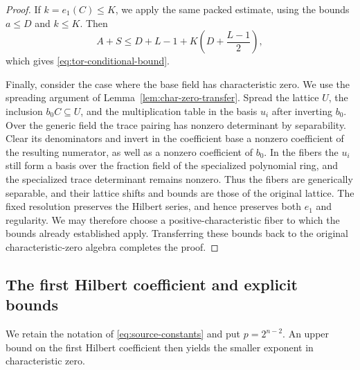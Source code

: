 \documentclass[12pt]{amsart}
\numberwithin{equation}{section}
\theoremstyle{definition}
\theoremstyle{remark}
\numberwithin{equation}{section}
\begin{document}
\begin{proof}
	If $k=e_1(C)\le K$, we apply the same packed estimate, using the
	bounds $a\le D$ and $k\le K$. Then
	\[
	A+S\le D+L-1+K\left(D+\frac{L-1}{2}\right),
	\]
	which gives \eqref{eq:tor-conditional-bound}.

Finally, consider the case where the base field has characteristic zero. We use the spreading argument of
Lemma~\ref{lem:char-zero-transfer}.  Spread the lattice $U$, the inclusion $b_0C\subseteq U$, and the multiplication table in the basis $u_i$ after inverting $b_0$. Over the generic field the trace pairing has nonzero determinant by separability. Clear its denominators and invert in the coefficient base a nonzero coefficient of the resulting numerator, as well as a nonzero coefficient of $b_0$. In the fibers the $u_i$ still form a basis over the fraction field of the specialized polynomial ring, and the specialized trace determinant remains nonzero. Thus the fibers are generically separable, and their lattice shifts and bounds are those of the original lattice. The fixed resolution preserves the Hilbert series, and hence preserves both $e_1$ and regularity.
We may therefore choose a positive-characteristic fiber to which the bounds already established apply. Transferring
these bounds back to the original characteristic-zero algebra completes the proof.
\end{proof}

\subsection{The first Hilbert coefficient and explicit bounds}
\label{subsec:hilbert-explicit}

We retain the notation of \eqref{eq:source-constants} and put $p=2^{n-2}$.  An upper  bound  on the first Hilbert coefficient  then yields the smaller exponent in characteristic zero.
\end{document}
